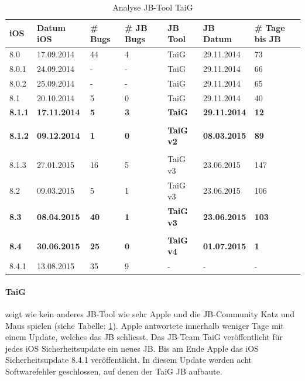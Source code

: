\begin{table}[htp!]
    \begin{center}
        \begin{tabular}{| p{10mm} | p{22mm} | p{17mm} | p{12mm} | p{18mm} | p{22mm} | p{15mm} |} \hline
            \textbf{iOS} & \textbf{Datum iOS} & \textbf{\# Bugs} & \textbf{\# JB Bugs} & \textbf{JB Tool} & \textbf{JB Datum} & \textbf{\# Tage bis JB} \\ \hline 
8.0 & 17.09.2014 & 44 & 4 & TaiG & 29.11.2014 & 73  \\ \hline
8.0.1 & 24.09.2014	& - & - & TaiG & 29.11.2014 & 66 \\ \hline
8.0.2 & 25.09.2014 & - & -  & TaiG & 29.11.2014 & 65  \\ \hline
8.1 & 20.10.2014 & 5 & 0 & TaiG & 29.11.2014 & 40  \\ \hline
\textbf{8.1.1} & \textbf{17.11.2014} & \textbf{5} & \textbf{3} & \textbf{TaiG} & \textbf{29.11.2014} & \textbf{12}  \\ \hline
 & & & & & & \\ \hline						
\textbf{8.1.2} & \textbf{09.12.2014} & \textbf{1} & \textbf{0} & \textbf{TaiG v2} & \textbf{08.03.2015} & \textbf{89}  \\ \hline
	 & & & & & & \\ \hline						
8.1.3 & 27.01.2015 & 16 & 5 & TaiG v3 & 23.06.2015 & 147  \\ \hline
8.2  & 09.03.2015 & 5 & 1 & TaiG v3 & 23.06.2015 & 106 \\ \hline
\textbf{8.3} &  \textbf{08.04.2015} & \textbf{40} & \textbf{1} & \textbf{TaiG v3} & \textbf{23.06.2015} & \textbf{103}  \\ \hline
		 & & & & & & \\ \hline					
\textbf{8.4} &  \textbf{30.06.2015} & \textbf{25} & \textbf{0} & \textbf{TaiG v4} & \textbf{01.07.2015} & \textbf{1}  \\ \hline
8.4.1 & 13.08.2015 & 35 & 9 & - & - & -   \\ \hline
        \end{tabular} 
        \caption{Analyse JB-Tool TaiG \protect\footnotemark}
        \label{tab:AnalyseTaig}
    \end{center}
\end{table}

\paragraph{TaiG} zeigt wie kein anderes JB-Tool wie sehr Apple und die JB-Community Katz und Maus spielen  (siehe Tabelle: \ref{tab:AnalyseTaig}). Apple antwortete innerhalb weniger Tage mit einem Update, welches das JB schliesst. Das JB-Team TaiG veröffentlicht für jedes iOS Sicherheitsupdate ein neues JB. Bis am Ende Apple das iOS Sicherheitsupdate 8.4.1 veröffentlicht. In diesem Update werden acht Softwarefehler geschlossen, auf denen der TaiG JB aufbaute. 
 
